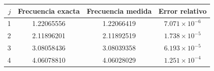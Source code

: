 \begin{tabular}{rccc}
\toprule
$j$ & Frecuencia exacta & Frecuencia medida & Error relativo \\
\midrule
1 & 1.22065556 & 1.22066419 & $7.071\times10^{-6}$ \\
2 & 2.11896201 & 2.11892519 & $1.738\times10^{-5}$ \\
3 & 3.08058436 & 3.08039358 & $6.193\times10^{-5}$ \\
4 & 4.06078810 & 4.06028029 & $1.251\times10^{-4}$ \\
\bottomrule
\end{tabular}
